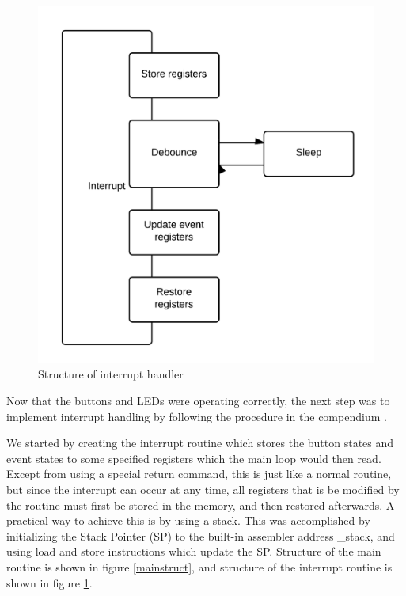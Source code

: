 \begin{figure}
  \centering
    \includegraphics[height=0.4\textheight]{Interrupt}
  \caption{Structure of interrupt handler}
  \label{interruptstruct}
\end{figure}


Now that the buttons and LEDs were operating correctly, the next step was to implement interrupt handling by following the procedure in the compendium \cite[Section 2.5.2]{compendium}.

We started by creating the interrupt routine which stores the button states and event states to some specified registers which the main loop would then read. Except from using a special return command, this is just like a normal routine, but since the interrupt can occur at any time, all registers that is be modified by the routine must first be stored in the memory, and then restored afterwards. A practical way to achieve this is by using a stack. This was accomplished by initializing the Stack Pointer (SP) to the built-in assembler address \_stack, and using load and store instructions which update the SP. Structure of the main routine is shown in figure \ref{mainstruct}, and structure of the interrupt routine is shown in figure \ref{interruptstruct}.

